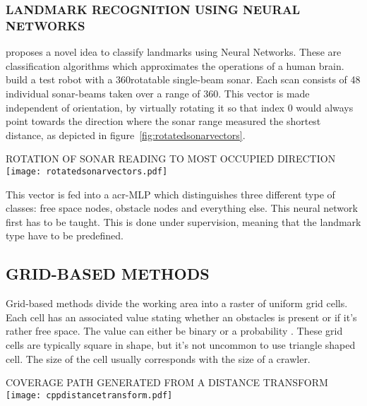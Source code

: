 \subsubsection{LANDMARK RECOGNITION USING NEURAL NETWORKS}
\citet{wong_qualitative_2006} proposes a novel idea to classify landmarks using Neural Networks. These are
classification algorithms which approximates the operations of a human brain. \citeauthor{wong_qualitative_2006} build a
test robot with a 360\textdegree rotatable single-beam sonar. Each scan consists of 48 individual sonar-beams taken over
a range of 360\textdegree. This vector is made independent of orientation, by virtually rotating it so that index 0
would always point towards the direction where the sonar range measured the shortest distance, as depicted in
figure~\ref{fig:rotatedsonarvectors}.

\begin{RoyalFigure}[!htb, label=fig:rotatedsonarvectors]{ROTATION OF SONAR READING TO MOST OCCUPIED 
DIRECTION~\cite{wong_qualitative_2006}}
    \texttt{[image: rotatedsonarvectors.pdf]}
\end{RoyalFigure}

This vector is fed into a \gls{acr-MLP} which distinguishes three different type of classes: free space nodes,
obstacle nodes and everything else. This neural network first has to be taught. This is done under supervision, meaning
that the landmark type have to be predefined.

\subsection{GRID-BASED METHODS}
Grid-based methods divide the working area into a raster of uniform grid cells. Each cell has an associated value 
stating whether an obstacles is present or if it's rather free space. The value can either be binary or a probability
\cite{galceran_coverage_2014}. These grid cells are typically square in shape, but it's not uncommon to use triangle 
shaped cell. The size of the cell usually corresponds with the size of a crawler.

\begin{RoyalFigure}[!htb, label=fig:ccpdistancetransform]{COVERAGE PATH GENERATED FROM A DISTANCE 
TRANSFORM~\cite{wong_qualitative_2006}}
    \texttt{[image: cppdistancetransform.pdf]}
\end{RoyalFigure}

